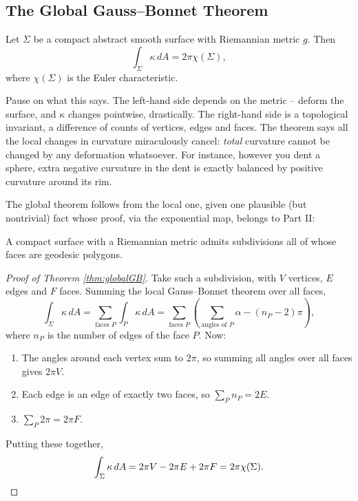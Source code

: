 \documentclass[a4paper]{scrartcl}
\begin{document}
\subsection{The Global Gauss--Bonnet Theorem}

\begin{theorem}\label{thm:globalGB}
    Let $\Sigma$ be a compact abstract smooth surface with Riemannian metric $g$. Then
    $$
    \int_\Sigma \kappa \, dA = 2 \pi \chi(\Sigma),
    $$
    where $\chi(\Sigma)$ is the Euler characteristic.
\end{theorem}

Pause on what this says. The left-hand side depends on the metric -- deform the surface, and $\kappa$ changes pointwise, drastically. The right-hand side is a topological invariant, a difference of counts of vertices, edges and faces. The theorem says all the local changes in curvature miraculously cancel: \emph{total} curvature cannot be changed by any deformation whatsoever. For instance, however you dent a sphere, extra negative curvature in the dent is exactly balanced by positive curvature around its rim.

The global theorem follows from the local one, given one plausible (but nontrivial) fact whose proof, via the exponential map, belongs to Part II:

\begin{lemma}
    A compact surface with a Riemannian metric admits subdivisions all of whose faces are geodesic polygons.
\end{lemma}

\begin{proof}[Proof of Theorem \ref{thm:globalGB}]
    Take such a subdivision, with $V$ vertices, $E$ edges and $F$ faces. Summing the local Gauss--Bonnet theorem over all faces,
    $$
    \int_\Sigma \kappa \, dA = \sum_{\text{faces } P} \int_P \kappa \, dA = \sum_{\text{faces } P} \left(\sum_{\text{angles of } P} \alpha - (n_P - 2)\pi\right),
    $$
    where $n_P$ is the number of edges of the face $P$. Now:
    \begin{enumerate}[label=(\roman*)]
        \item The angles around each vertex sum to $2\pi$, so summing all angles over all faces gives $2\pi V$.
        \item Each edge is an edge of exactly two faces, so $\sum_P n_P = 2E$.
        \item $\sum_P 2\pi = 2\pi F$.
    \end{enumerate}
    Putting these together,
    $$
    \int_\Sigma \kappa \, dA = 2\pi V - 2\pi E + 2\pi F = 2\pi \chi(\Sigma). \qedhere
    $$
\end{proof}
\end{document}
